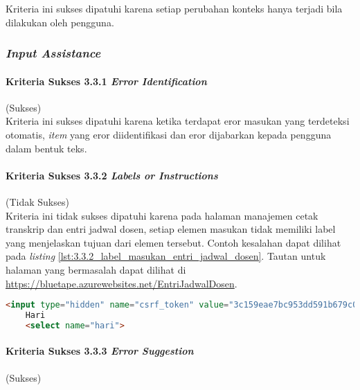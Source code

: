 Kriteria ini sukses dipatuhi karena setiap perubahan konteks hanya terjadi bila dilakukan oleh pengguna.

\subsubsection{\textit{Input Assistance}}
\label{subsubsec:kepatuhan_bluetape_input_assistance}

\paragraph{Kriteria Sukses 3.3.1 \textit{Error Identification}}
\label{par:kepatuhan_bluetape_kriteria_sukses_3.3.1}
(Sukses)\\

Kriteria ini sukses dipatuhi karena ketika terdapat eror masukan yang terdeteksi otomatis, \textit{item} yang eror diidentifikasi dan eror dijabarkan kepada pengguna dalam bentuk teks.

\paragraph{Kriteria Sukses 3.3.2 \textit{Labels or Instructions}}
\label{par:kepatuhan_bluetape_kriteria_sukses_3.3.2}
(Tidak Sukses)\\

Kriteria ini tidak sukses dipatuhi karena pada halaman manajemen cetak transkrip dan entri jadwal dosen, setiap elemen masukan tidak memiliki label yang menjelaskan tujuan dari elemen tersebut. Contoh kesalahan dapat dilihat pada \textit{listing} \ref{lst:3.3.2_label_masukan_entri_jadwal_dosen}. Tautan untuk halaman yang bermasalah dapat dilihat di \url{https://bluetape.azurewebsites.net/EntriJadwalDosen}.

\begin{lstlisting}[frame=single, label={lst:3.3.2_label_masukan_entri_jadwal_dosen}, language=HTML, caption=Pelanggaran Kriteria Sukses 3.3.2 pada Halaman Entri Jadwal Dosen]
    <input type="hidden" name="csrf_token" value="3c159eae7bc953dd591b679c080ed066"/>
    Hari
    <select name="hari">
\end{lstlisting}

\paragraph{Kriteria Sukses 3.3.3 \textit{Error Suggestion}}
\label{par:kepatuhan_bluetape_kriteria_sukses_3.3.3}
(Sukses)\\

